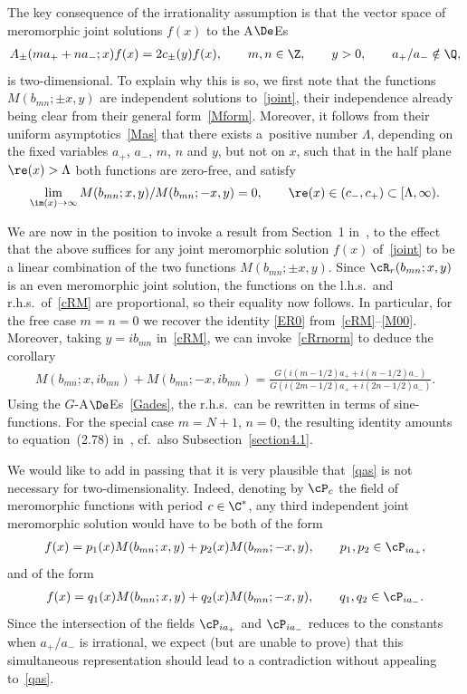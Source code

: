 \documentclass[pdftex]{sigma}
\numberwithin{equation}{section}
\begin{document}
The key consequence of the irrationality assumption is that the vector space of meromorphic joint solutions $f(x)$ to the A$\De$Es
\begin{gather}\label{joint}
A_{\pm}( ma_{+}+na_{-};x)f(x)=2c_{\pm}(y)f(x),\qquad  m,n\in\Z,\qquad y>0,\qquad  a_{+}/a_{-}\notin \Q,
\end{gather}
is two-dimensional.
To explain why this is so, we f\/irst note that the functions $M(b_{mn};\pm x,y)$ are independent solutions to~\eqref{joint}, their independence already being clear from their general form~\eqref{Mform}. Moreover, it follows from their uniform asymptotics~\eqref{Mas} that there exists a~po\-si\-ti\-ve number $\Lambda$, depending on the f\/ixed variables $a_+$, $a_-$, $m$, $n$ and $y$, but not on $x$, such that in the half plane $\re(x)>\Lambda$ both functions are zero-free, and satisfy
\begin{gather}\label{qas}
\lim_{\im(x)\to\infty}M(b_{mn};x,y)/M(b_{mn};-x,y)=0,\qquad \re(x)\in (c_{-},c_{+})\subset [\Lambda, \infty).
\end{gather}

We are now in the position to invoke a result from Section~1 in~\cite{side}, to the ef\/fect that the above  suf\/f\/ices for any joint meromorphic solution $f(x)$ of~\eqref{joint} to be a linear combination of the two functions $M(b_{mn};\pm x,y)$.  Since $\cR_r(b_{mn};x,y)$ is an even meromorphic joint solution, the functions on the l.h.s.\ and r.h.s.\ of~\eqref{cRM} are proportional, so their equality now follows. In particular, for the free case $m=n=0$ we recover the identity \eqref{ER0} from~\eqref{cRM}--\eqref{M00}. Moreover, taking $y=ib_{mn}$ in~\eqref{cRM}, we can invoke~\eqref{cRrnorm} to deduce the corollary
\begin{gather}\label{Mid}
M(b_{mn};x,ib_{mn})+M(b_{mn};-x,ib_{mn})=\frac{G(i(m-1/2)a_{+}+i(n-1/2)a_{-})}{G(i(2m-1/2)a_{+}+i(2n-1/2)a_{-})}.
\end{gather}
Using the $G$-A$\De$Es~\eqref{Gades}, the r.h.s.\ can be rewritten in terms of sine-functions. For the special case $m=N+1$, $n=0$, the resulting identity amounts to equation~(2.78) in~\cite{GLFII}, cf.~also Subsection~\ref{section4.1}.

We would like to add in passing that it is very plausible that~\eqref{qas} is not necessary for two-dimensionality. Indeed, denoting by $\cP_c$ the f\/ield of meromorphic functions with period $c\in\C^{*}$, any third independent joint meromorphic solution would have to be both of the form
\begin{gather}\label{form1}
f(x)=p_1(x)M(b_{mn};x,y)+p_2(x)M(b_{mn};-x,y),\qquad p_1,p_2\in\cP_{ia_{+}},
\end{gather}
and of the form
\begin{gather}\label{form2}
f(x)=q_1(x)M(b_{mn};x,y)+q_2(x)M(b_{mn};-x,y),\qquad  q_1,q_2\in\cP_{ia_{-}}.
\end{gather}
Since the intersection of the f\/ields $\cP_{ia_{+}}$ and $\cP_{ia_{-}}$ reduces
 to the constants when $a_{+}/a_{-}$ is irrational, we expect (but are unable to prove) that this simultaneous representation should lead to a contradiction without appealing to~\eqref{qas}.
\end{document}
